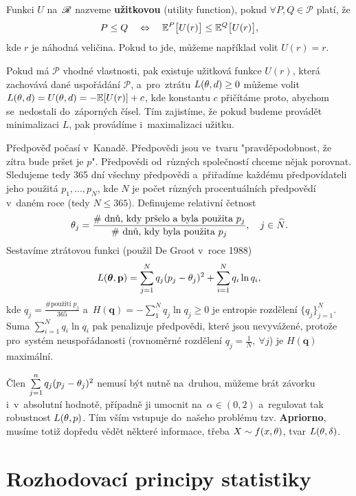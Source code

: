 \begin{define}
	Funkci $U$ na~$\mathscr{R}$ nazveme \textbf{užitkovou} (utility function), pokud $\forall P,Q\in\mathcal{P}$ platí, že 
	$$ P\leq Q\quad\Leftrightarrow\quad\mathbb{E}^P\big[U(r)\big]\leq\mathbb{E}^Q\big[U(r)\big],$$ kde $r$ je náhodná veličina. Pokud to jde, můžeme například volit $U(r)=r$.
\end{define}
\begin{remark}
	Pokud má $\mathcal{P}$ vhodné vlastnosti, pak existuje užitková funkce $U(r)$, která zachovává dané uspořádání $\mathcal{P}$, a~pro~ztrátu $L(\theta,d)\geq 0$ můžeme volit $L(\theta,d)=U(\theta,d)=-\mathbb{E}[U(r)]+c$, kde konstantu $c$ přičítáme proto, abychom se~nedostali do~záporných čísel. Tím zajistíme, že pokud budeme provádět minimalizaci $L$, pak provádíme i~maximalizaci užitku.
\end{remark}
\begin{example}[volba L]
		Předpověď počasí v~Kanadě. Předpovědi jsou ve~tvaru "pravděpodobnost, že zítra bude pršet je $p$". Předpovědi od~různých společností chceme nějak porovnat. Sledujeme tedy 365 dní všechny předpovědi a~přiřadíme každému předpovídateli jeho použitá $p_1,...,p_N$, kde $N$ je počet různých procentuálních předpovědí v~daném roce (tedy $N\leq 365$). Definujeme relativní četnost $$\theta_j=\frac{\text{\# dnů, kdy pršelo a~byla použita }p_j}{\text{\# dnů, kdy byla použita }p_j},\quad j\in\widehat{N}.$$ Sestavíme ztrátovou funkci (použil De Groot v~roce 1988) $$L(\boldsymbol{\theta},\textbf{p})=\sum_{j=1}^N q_j(p_j-\theta_j)^2+\sum_{i=1}^N q_i\ln q_i,$$ kde $q_j=\frac{\text{\# použití }p_j}{365}$ a~$H(\textbf{q})=-\sum_1^N q_j\ln q_j\geq 0$ je entropie rozdělení $\{q_j\}_{j=1}^N$. Suma $\sum_{i=1}^N q_i\ln q_i$ pak penalizuje předpovědi, které jsou nevyvážené, protože pro~systém neuspořádanosti (rovnoměrné rozdělení $q_j=\frac{1}{N},~\forall j$) je $H(\textbf{q})$ maximální.
		
		Člen $\sum\limits_{j=1}^{n} q_j(p_j-\theta_j)^2$ nemusí být nutně na~druhou, můžeme brát závorku i~v~absolutní hodnotě, případně ji umocnit na~$\alpha\in(0,2)$ a~regulovat tak robustnost $L(\theta,p)$. Tím vším vstupuje do~našeho problému tzv. \textbf{Apriorno}, musíme totiž dopředu vědět některé informace, třeba $X\sim f(x,\theta)$, tvar $L(\theta,\delta)$. 
\end{example}

\chapter{Rozhodovací principy statistiky}

